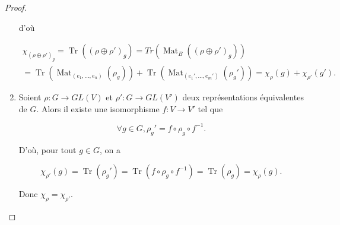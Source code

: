 \documentclass[french]{book}
\theoremstyle{definition}
\theoremstyle{remark}
\begin{document}
\begin{proof}
\begin{enumerate}
      d'où

      \begin{gather*}
        \chi _{(\rho\oplus \rho')_g} = \operatorname{Tr}((\rho\oplus \rho')_g) = Tr(\operatorname{Mat}_B((\rho \oplus \rho')_g))\\
         = \operatorname{Tr}(\operatorname{Mat} _{(e_1, \dots, e_n)}(\rho_g))+ \operatorname{Tr}(\operatorname{Mat} _{(e_1', \dots, e_m')}(\rho_g')) = \chi _{\rho}(g) + \chi _{\rho'}(g').
      \end{gather*}

      \item Soient \(\rho : G \longrightarrow GL(V)\) et \(\rho' : G \longrightarrow GL(V')\) deux représentations équivalentes de \(G\). Alors il existe une isomorphisme \(f : V \longrightarrow V'\) tel que

      \[\forall g \in G, \rho_g' = f \circ \rho_g \circ f ^{-1}.\]

      D'où, pour tout \(g \in G\), on a

      \[\chi _{\rho'}(g) = \operatorname{Tr}(\rho_g') = \operatorname{Tr}(f \circ \rho_g \circ f ^{-1}) = \operatorname{Tr}(\rho_g) = \chi _{\rho}(g).\]

      Donc \(\chi _{\rho} = \chi _{\rho'}\).
  \end{enumerate}
\end{proof}

\end{document}
